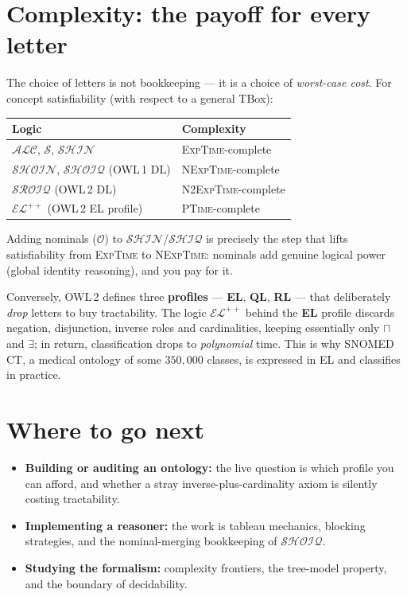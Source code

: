 \documentclass[11pt]{article}
\newcommand{\dl}[1]{\ensuremath{\mathcal{#1}}}%
\newcommand{\inter}{\sqcap}
\theoremstyle{definition}
\begin{document}
\section{Complexity: the payoff for every letter}

The choice of letters is not bookkeeping --- it is a choice of
\emph{worst-case cost}. For concept satisfiability (with respect to a general
TBox):

\begin{center}
\begin{tabular}{@{}ll@{}}
\toprule
Logic & Complexity \\
\midrule
$\dl{ALC}$, \; $\dl{S}$, \; $\dl{SHIN}$                & \textsc{ExpTime}-complete \\
$\dl{SHOIN}$, \; $\dl{SHOIQ}$ \;(OWL\,1 DL)            & \textsc{NExpTime}-complete \\
$\dl{SROIQ}$ \;(OWL\,2 DL)                             & \textsc{N2ExpTime}-complete \\
\midrule
$\dl{EL}^{++}$ \;(OWL\,2 EL profile)                   & \textsc{PTime}-complete \\
\bottomrule
\end{tabular}
\end{center}

Adding nominals ($\dl{O}$) to $\dl{SHIN}$/$\dl{SHIQ}$ is precisely the step that
lifts satisfiability from \textsc{ExpTime} to \textsc{NExpTime}: nominals add
genuine logical power (global identity reasoning), and you pay for it.

Conversely, OWL\,2 defines three \textbf{profiles} --- \textbf{EL}, \textbf{QL},
\textbf{RL} --- that deliberately \emph{drop} letters to buy tractability. The
logic $\dl{EL}^{++}$ behind the \textbf{EL} profile discards negation,
disjunction, inverse roles and cardinalities, keeping essentially only $\inter$
and $\exists$; in return, classification drops to \emph{polynomial} time. This
is why SNOMED\,CT, a medical ontology of some $350{,}000$ classes, is expressed
in EL and classifies in practice.

\section{Where to go next}

\begin{itemize}[nosep]
  \item \textbf{Building or auditing an ontology:} the live question is which
        profile you can afford, and whether a stray
        inverse-plus-cardinality axiom is silently costing tractability.
  \item \textbf{Implementing a reasoner:} the work is tableau mechanics,
        blocking strategies, and the nominal-merging bookkeeping of $\dl{SHOIQ}$.
  \item \textbf{Studying the formalism:} complexity frontiers, the tree-model
        property, and the boundary of decidability.
\end{itemize}
\end{document}
